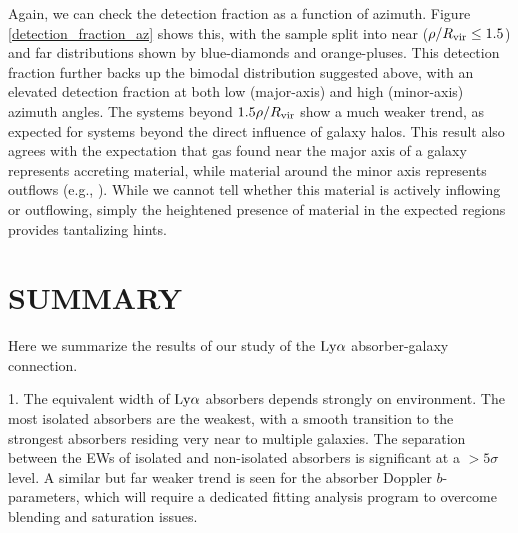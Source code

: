 \documentclass[twocolumn,tighten]{aastex62}
\newcommand{\HI}{\mbox{H\,{\sc i}} }
\begin{document}
Again, we can check the detection fraction as a function of azimuth. Figure \ref{detection_fraction_az} shows this, with the sample split into near ($\rho / R_{\rm vir} \leq 1.5$) and far distributions shown by blue-diamonds and orange-pluses. This detection fraction further backs up the bimodal distribution suggested above, with an elevated detection fraction at both low (major-axis) and high (minor-axis) azimuth angles. The systems beyond $1.5 \rho / R_{\rm vir}$ show a much weaker trend, as expected for systems beyond the direct influence of galaxy halos. This result also agrees with the expectation that gas found near the major axis of a galaxy represents accreting material, while material around the minor axis represents outflows (e.g., \citealt{bordoloi2011, bouche2012, kacprzak2012, bordoloi2014, nielsen2015}). While we cannot tell whether this material is actively inflowing or outflowing, simply the heightened presence of material in the expected regions provides tantalizing hints.




\section{SUMMARY}
Here we summarize the results of our study of the $\rm Ly\alpha$ absorber-galaxy connection.

1. The equivalent width of $\rm Ly\alpha$ absorbers depends strongly on environment. The most isolated absorbers are the weakest, with a smooth transition to the strongest absorbers residing very near to multiple galaxies. The separation between the EWs of isolated and non-isolated absorbers is significant at a $> 5\sigma$ level. A similar but far weaker trend is seen for the absorber Doppler $b$-parameters, which will require a dedicated fitting analysis program to overcome blending and saturation issues.

\end{document}
